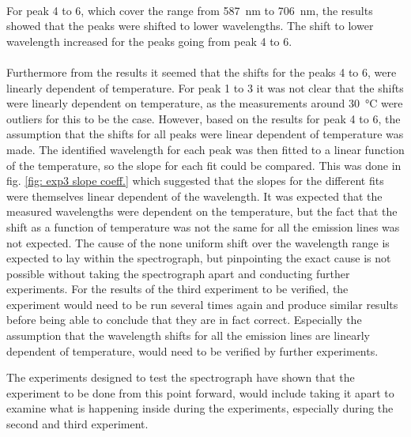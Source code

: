 \\
For peak 4 to 6, which cover the range from \SI{587}{\nano\meter} to \SI{706}{\nano\meter}, the results showed that the peaks were shifted to lower wavelengths. The shift to lower wavelength increased for the peaks going from peak 4 to 6. 
\\
\\
Furthermore from the results it seemed that the shifts for the peaks 4 to 6, were linearly dependent of temperature. For peak 1 to 3 it was not clear that the shifts were linearly dependent on temperature, as the measurements around \SI{30}{\degreeCelsius} were outliers for this to be the case. However, based on the results for peak 4 to 6, the assumption that the shifts for all peaks were linear dependent of temperature was made. The identified wavelength for each peak was then fitted to a linear function of the temperature, so the slope for each fit could be compared. This was done in fig. \ref{fig: exp3 slope coeff.} which suggested that the slopes for the different fits were themselves linear dependent of the wavelength. It was expected that the measured wavelengths were dependent on the temperature, but the fact that the shift as a function of temperature was not the same for all the emission lines was not expected. The cause of the none uniform shift over the wavelength range is expected to lay within the spectrograph, but pinpointing the exact cause is not possible without taking the spectrograph apart and conducting further experiments.
For the results of the third experiment to be verified, the experiment would need to be run several times again and produce similar results before being able to conclude that they are in fact correct. Especially the assumption that the wavelength shifts for all the emission lines are linearly dependent of temperature, would need to be verified by further experiments.

The experiments designed to test the spectrograph have shown that the experiment to be done from this point forward, would include taking it apart to examine what is happening inside during the experiments, especially during the second and third experiment. 



